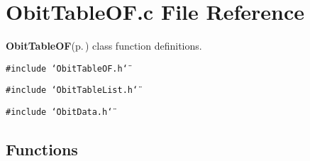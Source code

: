 \section{Obit\-Table\-OF.c File Reference}
\label{ObitTableOF_8c}
{\bf Obit\-Table\-OF}{\rm (p.\,\pageref{structObitTableOF})} class function definitions. 

{\tt \#include \char`\"{}Obit\-Table\-OF.h\char`\"{}}\par
{\tt \#include \char`\"{}Obit\-Table\-List.h\char`\"{}}\par
{\tt \#include \char`\"{}Obit\-Data.h\char`\"{}}\par
\subsection*{Functions}

